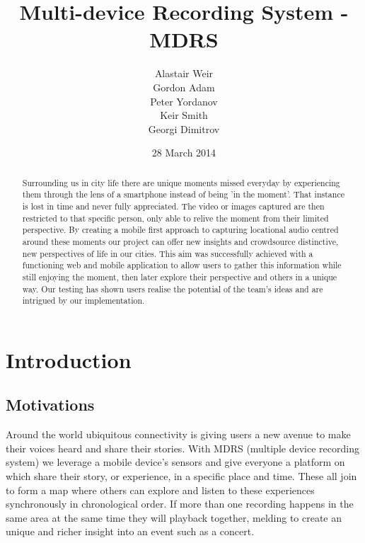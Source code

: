 \documentclass{l3proj}
\begin{document}
\setcounter{secnumdepth}{3}
\title{Multi-device Recording System - MDRS}
\author{Alastair Weir \\
        Gordon Adam \\
        Peter Yordanov \\
        Keir Smith \\
        Georgi Dimitrov}
\date{28 March 2014}
\maketitle
\begin{abstract}

Surrounding us in city life there are unique moments missed everyday by experiencing  them through the lens of a smartphone instead of being 'in the moment'. That instance is lost in time and never fully appreciated. The video or images captured are then restricted to that specific person, only able to relive the moment from their limited perspective. By creating a mobile first approach to capturing locational audio centred around these moments our project can offer new insights and crowdsource distinctive, new  perspectives of life in our cities. This aim was successfully achieved with a functioning web and mobile application to allow users to gather this information while still enjoying the moment, then later explore their perspective and others in a unique way. Our testing has shown users realise the potential of the team's ideas and are intrigued by our implementation.

\end{abstract}
\educationalconsent
\tableofcontents
\chapter{Introduction}
\label{intro}

\section{Motivations}
Around the world ubiquitous connectivity is giving users a new avenue to make their voices heard and share their stories. With MDRS (multiple device recording system) we leverage a mobile device’s sensors and give everyone a platform on which share their story, or experience, in a specific place and time. These all join to form a map where others can explore and listen to these experiences synchronously in chronological order. If more than one recording happens in the same area at the same time they will playback together, melding to create an unique and richer insight into an event such as a concert.
\end{document}
